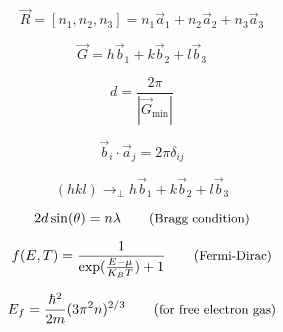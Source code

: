 \begin{equation}
    \vec{R} = [n_{1}, n_{2}, n_{3}] = n_{1}\vec{a}_{1} + n_{2}\vec{a}_{2} + n_{3}\vec{a}_{3}
\end{equation}

\begin{equation}
    \vec{G} = h\vec{b}_{1} + k\vec{b}_{2} + l\vec{b}_{3}
\end{equation}

\begin{equation}
    d = \frac{2\pi}{|\vec{G}_{\text{min}}|}
\end{equation}

\begin{equation}
    \vec{b}_{i} \cdot \vec{a}_{j} = 2\pi \delta_{ij}
\end{equation}

\begin{equation}
    (hkl) \rightarrow_{\perp} h\vec{b}_{1} + k\vec{b}_{2} + l\vec{b}_{3}
\end{equation}

\begin{equation}
    2 d \sin(\theta) = n \lambda \comment{Bragg condition}
\end{equation}

\begin{equation}
    f(E,T) = \frac{1}{\exp(\frac{E-\mu}{K_{B}T}) + 1} \comment{Fermi-Dirac}
\end{equation}

\begin{equation}
    E_{f} = \frac{\hbar^{2}}{2m} (3\pi^{2}n)^{2/3} \comment{for free electron gas}
\end{equation}





